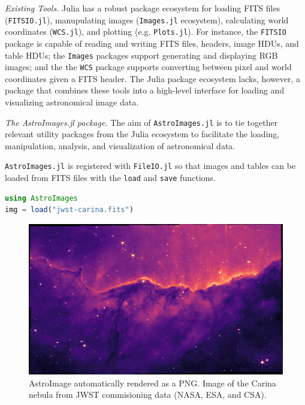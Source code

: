 \documentclass{juliacon}
\begin{document}
\vspace{0.2cm}
\emph{Existing Tools.}
Julia has a robust package ecosystem for loading FITS files (\verb|FITSIO.jl|), manupulating images (\verb|Images.jl| ecosystem), calculating world coordinates (\verb|WCS.jl|), and plotting (e.g. \verb|Plots.jl|).
For instance, the \verb|FITSIO| package is capable of reading and writing FITS files, headers, image HDUs, and table HDUs;
the \verb|Images| packages support generating and displaying RGB images; 
and the the \verb|WCS| package supports converting between pixel and world coordinates given a FITS header.
The Julia package ecosystem lacks, however, a package that combines these tools into a high-level interface for loading and visualizing astronomical image data.

\clearpage
\emph{The AstroImages.jl package.}
The aim of \verb|AstroImages.jl| is to tie together relevant utility packages from the Julia ecosystem to facilitate the loading, manipulation, analysis, and visualization of astronomical data.

\verb|AstroImages.jl| is registered with \verb|FileIO.jl| so that images and tables can be loaded from FITS files with the \verb|load| and \verb|save| functions.
\begin{lstlisting}[language = Julia]
using AstroImages
img = load("jwst-carina.fits")
\end{lstlisting}

\vspace{-0.4cm}
\begin{figure}[hbt!]
\centerline{\includegraphics[width=\columnwidth]{carina.png}}
\caption{AstroImage automatically rendered as a PNG. Image of the Carina nebula from JWST commisioning data (NASA, ESA, and CSA).}
  \label{fig:jwst-carina}
\end{figure}
\FloatBarrier 
\end{document}
